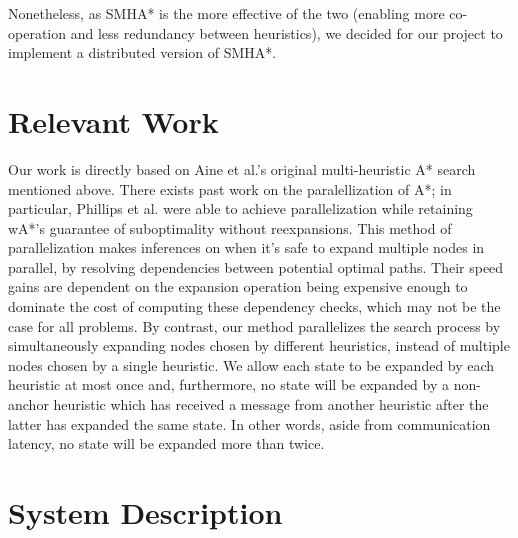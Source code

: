 \documentclass{article}
\begin{document}
Nonetheless, as SMHA* is the more effective of the two (enabling more co-operation and less redundancy between heuristics), we decided for our project to implement a distributed version of SMHA*.

\section{Relevant Work}

Our work is directly based on Aine et al.'s original multi-heuristic A* search \cite{Aine14} mentioned above. There exists past work on the paralellization of A*; in particular, Phillips et al. \cite{phillips2014pa} were able to achieve parallelization while retaining wA*'s guarantee of suboptimality without reexpansions. This method of parallelization makes inferences on when it's safe to expand multiple nodes in parallel, by resolving dependencies between potential optimal paths. Their speed gains are dependent on the expansion operation being expensive enough to dominate the cost of computing these dependency checks, which may not be the case for all problems. By contrast, our method parallelizes the search process by simultaneously expanding nodes chosen by different heuristics, instead of multiple nodes chosen by a single heuristic. We allow each state to be expanded by each heuristic at most once and, furthermore, no state will be expanded by a non-anchor heuristic which has received a message from another heuristic after the latter has expanded the same state. In other words, aside from communication latency, no state will be expanded more than twice.

\section{System Description}
\end{document}
